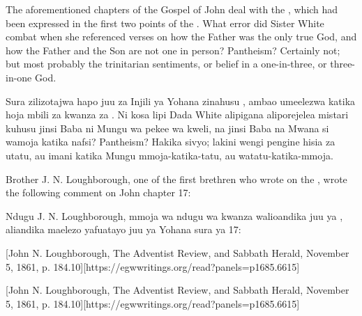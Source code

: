 The aforementioned chapters of the Gospel of John deal with the , which had been expressed in the first two points of the . What error did Sister White combat when she referenced verses on how the Father was the only true God, and how the Father and the Son are not one in person? Pantheism? Certainly not; but most probably the trinitarian sentiments, or belief in a one-in-three, or three-in-one God.


Sura zilizotajwa hapo juu za Injili ya Yohana zinahusu , ambao umeelezwa katika hoja mbili za kwanza za . Ni kosa lipi Dada White alipigana aliporejelea mistari kuhusu jinsi Baba ni Mungu wa pekee wa kweli, na jinsi Baba na Mwana si wamoja katika nafsi? Pantheism? Hakika sivyo; lakini wengi pengine hisia za utatu, au imani katika Mungu mmoja-katika-tatu, au watatu-katika-mmoja.


Brother J. N. Loughborough, one of the first brethren who wrote on the , wrote the following comment on John chapter 17:


Ndugu J. N. Loughborough, mmoja wa ndugu wa kwanza walioandika juu ya , aliandika maelezo yafuatayo juu ya Yohana sura ya 17:


[John N. Loughborough, The Adventist Review, and Sabbath Herald, November 5, 1861, p. 184.10][https://egwwritings.org/read?panels=p1685.6615]


[John N. Loughborough, The Adventist Review, and Sabbath Herald, November 5, 1861, p. 184.10][https://egwwritings.org/read?panels=p1685.6615]


